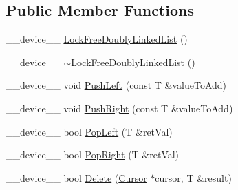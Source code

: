\subsection*{Public Member Functions}
\begin{DoxyCompactItemize}
\item 
\+\_\+\+\_\+device\+\_\+\+\_\+ \mbox{\hyperlink{class_n_u_c_a_r_lock_free_d_s_1_1_lock_free_doubly_linked_list_a79b2e6c603e8c7f8f6bb0ca6b9be21f0}{Lock\+Free\+Doubly\+Linked\+List}} ()
\item 
\+\_\+\+\_\+device\+\_\+\+\_\+ \mbox{\hyperlink{class_n_u_c_a_r_lock_free_d_s_1_1_lock_free_doubly_linked_list_a1b9de53c0b80a9630783fb6376c768e4}{$\sim$\+Lock\+Free\+Doubly\+Linked\+List}} ()
\item 
\+\_\+\+\_\+device\+\_\+\+\_\+ void \mbox{\hyperlink{class_n_u_c_a_r_lock_free_d_s_1_1_lock_free_doubly_linked_list_aa07c30942cfd1d8cc4eca96ce135ad31}{Push\+Left}} (const T \&value\+To\+Add)
\item 
\+\_\+\+\_\+device\+\_\+\+\_\+ void \mbox{\hyperlink{class_n_u_c_a_r_lock_free_d_s_1_1_lock_free_doubly_linked_list_ab607c1fd1700fa9fac344561144e0698}{Push\+Right}} (const T \&value\+To\+Add)
\item 
\+\_\+\+\_\+device\+\_\+\+\_\+ bool \mbox{\hyperlink{class_n_u_c_a_r_lock_free_d_s_1_1_lock_free_doubly_linked_list_a35981d7dca5fc10c5228c67c1d8a64d7}{Pop\+Left}} (T \&ret\+Val)
\item 
\+\_\+\+\_\+device\+\_\+\+\_\+ bool \mbox{\hyperlink{class_n_u_c_a_r_lock_free_d_s_1_1_lock_free_doubly_linked_list_a473e2484d607d9e0f93f98ad34e1d893}{Pop\+Right}} (T \&ret\+Val)
\item 
\+\_\+\+\_\+device\+\_\+\+\_\+ bool \mbox{\hyperlink{class_n_u_c_a_r_lock_free_d_s_1_1_lock_free_doubly_linked_list_a139e22629c23ed917b0375ec0db842de}{Delete}} (\mbox{\hyperlink{class_n_u_c_a_r_lock_free_d_s_1_1_lock_free_doubly_linked_list_1_1_cursor}{Cursor}} $\ast$cursor, T \&result)
\end{DoxyCompactItemize}

